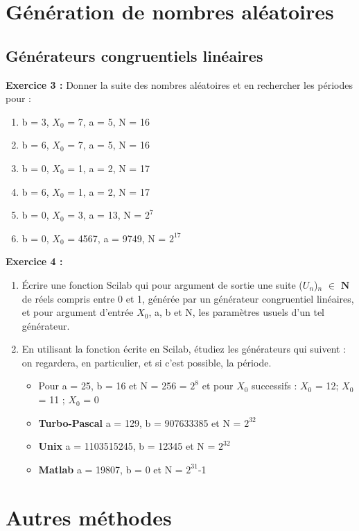 \documentclass{book}
\begin{document}
\section{Génération de nombres aléatoires}
\subsection{Générateurs congruentiels linéaires}
\textbf{Exercice 3 :}
Donner la suite des nombres aléatoires et en rechercher les périodes pour : 
\begin{enumerate}
	\item b = 3, $X_0$ = 7, a = 5, N = 16 
	\item b = 6, $X_0$ = 7, a = 5, N = 16 
	\item b = 0, $X_0$ = 1, a = 2, N = 17 
	\item b = 6, $X_0$ = 1, a = 2, N = 17 
	\item b = 0, $X_0$ = 3, a = 13, N = $2^7$ 
	\item b = 0, $X_0$ = 4567, a = 9749, N = $2^{17}$ 
\end{enumerate}
\textbf{Exercice 4 :}
\begin{enumerate}
	\item Écrire une fonction Scilab qui pour argument de sortie une suite ($U_{n}$)$_{n}$ $\in$ $\mathbf{N}$ de réels compris entre 0 et 1, générée par un générateur congruentiel linéaires, et pour argument d'entrée $X_0$, a, b et N, les paramètres usuels d'un tel générateur.
	\item En utilisant la fonction écrite en Scilab, étudiez les générateurs qui suivent : on regardera, en particulier, et si c'est possible, la période.
	\begin{itemize}
		\item Pour a = 25, b = 16 et N = 256 = $2^8$ et pour $X_0$ successifs : $X_0$ = 12; $X_0$ = 11 ; $X_0$ = 0
		\item \textbf{Turbo-Pascal} a = 129, b = 907633385 et N = $2^{32}$
		\item \textbf{Unix} a = 1103515245, b = 12345 et N = $2^{32}$
		\item \textbf{Matlab} a = 19807, b = 0 et N = $2^{31}$-1
	\end{itemize}
\end{enumerate}
\section{Autres méthodes}
\end{document}
